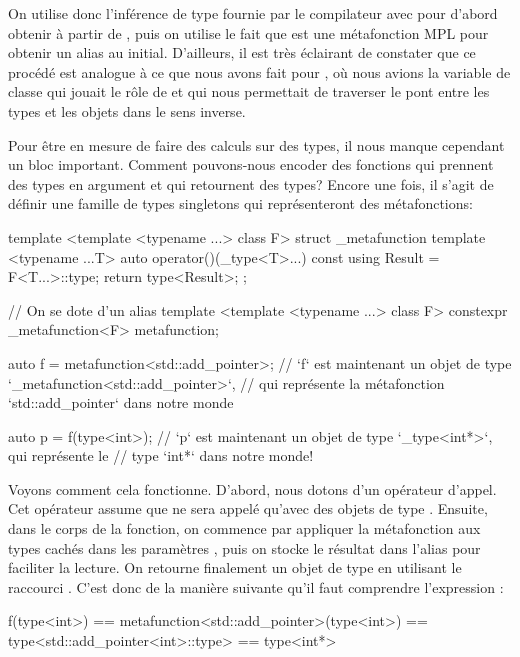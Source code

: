On utilise donc l'inférence de type fournie par le compilateur avec
 pour d'abord obtenir  à partir de ,
puis on utilise le fait que  est une métafonction MPL pour
obtenir un alias au  initial. D'ailleurs, il est très éclairant de
constater que ce procédé est analogue à ce que nous avons fait pour
, où nous avions la variable de classe 
qui jouait le rôle de  et qui nous permettait de traverser le pont
entre les types et les objets dans le sens inverse.

Pour être en mesure de faire des calculs sur des types, il nous manque
cependant un bloc important. Comment pouvons-nous encoder des fonctions
qui prennent des types en argument et qui retournent des types? Encore une
fois, il s'agit de définir une famille de types singletons qui représenteront
des métafonctions:
\begin{cpp}
    template <template <typename ...> class F>
    struct _metafunction {
        template <typename ...T>
        auto operator()(_type<T>...) const {
            using Result = F<T...>::type;
            return type<Result>;
        }
    };

    // On se dote d'un alias
    template <template <typename ...> class F>
    constexpr _metafunction<F> metafunction{};

    auto f = metafunction<std::add_pointer>;
    // `f` est maintenant un objet de type `_metafunction<std::add_pointer>`,
    // qui représente la métafonction `std::add_pointer` dans notre monde

    auto p = f(type<int>);
    // `p` est maintenant un objet de type `_type<int*>`, qui représente le
    // type `int*` dans notre monde!
\end{cpp}

Voyons comment cela fonctionne. D'abord, nous dotons 
d'un opérateur d'appel. Cet opérateur assume que  ne
sera appelé qu'avec des objets de type . Ensuite, dans le corps
de la fonction, on commence par appliquer la métafonction  aux types
 cachés dans les paramètres , puis on stocke le
résultat dans l'alias  pour faciliter la lecture. On retourne
finalement un objet de type  en utilisant le raccourci
. C'est donc de la manière suivante qu'il faut comprendre
l'expression :
\begin{cpp}
    f(type<int>) == metafunction<std::add_pointer>(type<int>)
                 == type<std::add_pointer<int>::type>
                 == type<int*>
\end{cpp}



